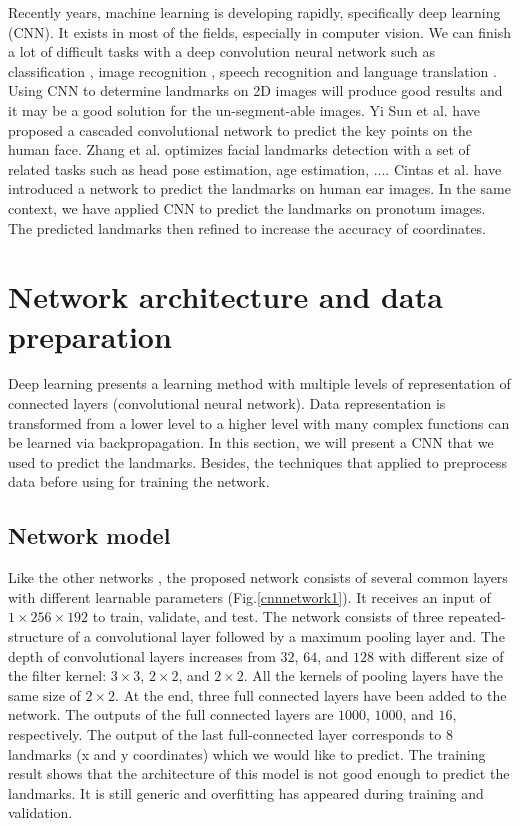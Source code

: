 \documentclass[10pt]{article}
\begin{document}
Recently years, machine learning is developing rapidly, specifically deep learning (CNN). It exists in most of the fields, especially in computer vision. We can finish a lot of difficult tasks with a deep convolution neural network such as classification \cite{krizhevsky2012imagenet, ciregan2012multi}, image recognition \cite{szegedy2015going, farabet2013learning, li2015convolutional}, speech recognition \cite{mikolov2011strategies, hinton2012deep} and language translation \cite{jean2014using, sutskever2014sequence}. Using CNN to determine landmarks on 2D images will produce good results and it may be a good solution for the un-segment-able images. Yi Sun et al. \cite{sun2013deep} have proposed a cascaded convolutional network to predict the key points on the human face. Zhang et al. \cite{zhang2014facial} optimizes facial landmarks detection with a set of related tasks such as head pose estimation, age estimation, .... Cintas et al. \cite{cintas2016automatic} have introduced a network to predict the landmarks on human ear images. In the same context, we have applied CNN to predict the landmarks on pronotum images. The predicted landmarks then refined to increase the accuracy of coordinates.

\section{Network architecture and data preparation}
Deep learning presents a learning method with multiple levels of representation of connected layers (convolutional neural network). Data representation is transformed from a lower level to a higher level with many complex functions can be learned via backpropagation. In this section, we will present a CNN that we used to predict the landmarks. Besides, the techniques that applied to preprocess data before using for training the network.
\subsection{Network model}
\label{secmodel}
Like the other networks \cite{lecun2010convolutional, li2015convolutional, cintas2016automatic}, the proposed network consists of several common layers with different learnable parameters (Fig.\ref{cnnnetwork1}). It receives an input of $1 \times 256 \times 192$ to train, validate, and test. The network consists of three repeated-structure of a convolutional layer followed by a maximum pooling layer and. The depth
of convolutional layers increases from $32$, $64$, and $128$ with
different size of the filter kernel: $3 \times 3$, $2 \times 2$, and $2 \times 2$.
All the kernels of pooling layers have the same size of $2 \times 2$. 
At the end, three full connected layers have been added to the
network. The outputs of the full connected layers are $1000$, $1000$,
and $16$, respectively. The output of the last full-connected
layer corresponds to 8 landmarks (x and y coordinates) which
we would like to predict. The training result shows that the architecture of this model is not good enough to predict the landmarks. It is still generic and overfitting has appeared during training and validation.
\end{document}
